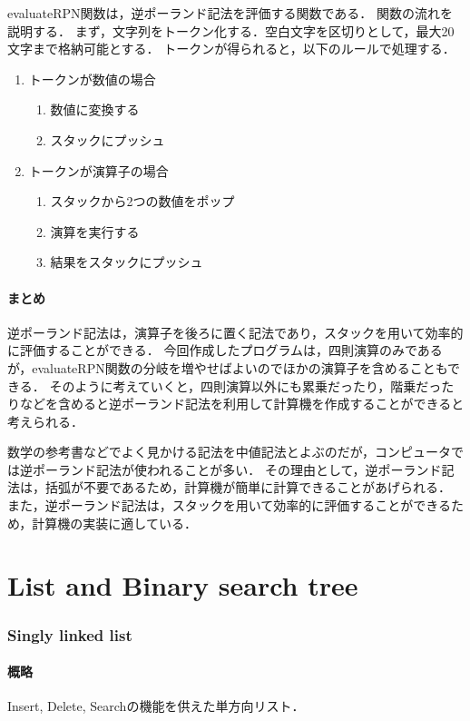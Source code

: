 \documentclass{ltjsarticle}
\begin{document}
evaluateRPN関数は，逆ポーランド記法を評価する関数である．
関数の流れを説明する．
まず，文字列をトークン化する．空白文字を区切りとして，最大20文字まで格納可能とする．
トークンが得られると，以下のルールで処理する．
\begin{enumerate}
    \item トークンが数値の場合
    \begin{enumerate}
        \item 数値に変換する
        \item スタックにプッシュ
    \end{enumerate}
    \item トークンが演算子の場合
    \begin{enumerate}
        \item スタックから2つの数値をポップ
        \item 演算を実行する
        \item 結果をスタックにプッシュ
    \end{enumerate}
\end{enumerate}

\subsection{まとめ}
逆ポーランド記法は，演算子を後ろに置く記法であり，スタックを用いて効率的に評価することができる．
今回作成したプログラムは，四則演算のみであるが，evaluateRPN関数の分岐を増やせばよいのでほかの演算子を含めることもできる．
そのように考えていくと，四則演算以外にも累乗だったり，階乗だったりなどを含めると逆ポーランド記法を利用して計算機を作成することができると考えられる．

数学の参考書などでよく見かける記法を中値記法とよぶのだが，コンピュータでは逆ポーランド記法が使われることが多い．
その理由として，逆ポーランド記法は，括弧が不要であるため，計算機が簡単に計算できることがあげられる．
また，逆ポーランド記法は，スタックを用いて効率的に評価することができるため，計算機の実装に適している．


\part{List and Binary search tree}

\section{Singly linked list}
\subsection{概略}
Insert, Delete, Searchの機能を供えた単方向リスト．
\end{document}
